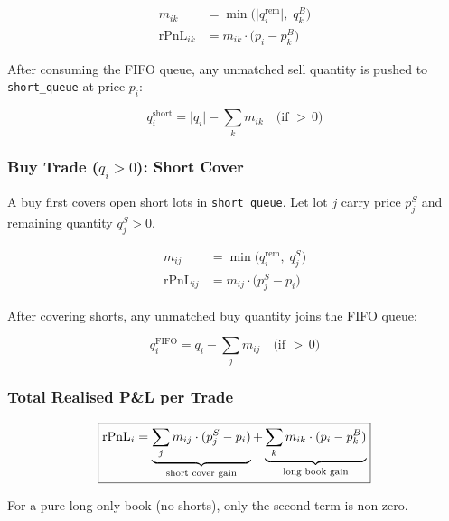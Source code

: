 \documentclass[11pt, a4paper]{article}
\begin{document}
\begin{align}
  m_{ik} &= \min\!\bigl(\lvert q_i^{\text{rem}}\rvert,\; q_k^{B}\bigr)
  \tag{matched quantity}\\[4pt]
  \text{rPnL}_{ik} &= m_{ik}\cdot\bigl(p_i - p_k^{B}\bigr)
  \label{eq:rpnl_sell}
  \tag{realised P\&L on sell}
\end{align}

After consuming the FIFO queue, any unmatched sell quantity is pushed
to \texttt{short\_queue} at price $p_i$:

\begin{equation}
  q_i^{\text{short}} = \lvert q_i \rvert - \sum_k m_{ik}
  \quad\text{(if } {>}\,0\text{)}
\end{equation}

\subsubsection{Buy Trade ($q_i > 0$): Short Cover}

A buy first covers open short lots in \texttt{short\_queue}.
Let lot $j$ carry price $p_j^{S}$ and remaining quantity $q_j^{S} > 0$.

\begin{align}
  m_{ij} &= \min\!\bigl(q_i^{\text{rem}},\; q_j^{S}\bigr)
  \tag{matched quantity}\\[4pt]
  \text{rPnL}_{ij} &= m_{ij}\cdot\bigl(p_j^{S} - p_i\bigr)
  \label{eq:rpnl_buy}
  \tag{realised P\&L on short cover}
\end{align}

After covering shorts, any unmatched buy quantity joins the FIFO queue:

\begin{equation}
  q_i^{\text{FIFO}} = q_i - \sum_j m_{ij}
  \quad\text{(if } {>}\,0\text{)}
\end{equation}

\subsubsection{Total Realised P\&L per Trade}

\begin{equation}
  \boxed{%
    \text{rPnL}_i
    = \underbrace{\sum_j m_{ij}\cdot(p_j^S - p_i)}_{\text{short cover gain}}
    + \underbrace{\sum_k m_{ik}\cdot(p_i - p_k^B)}_{\text{long book gain}}
  }
\end{equation}

For a pure long-only book (no shorts), only the second term is
non-zero.
\end{document}
